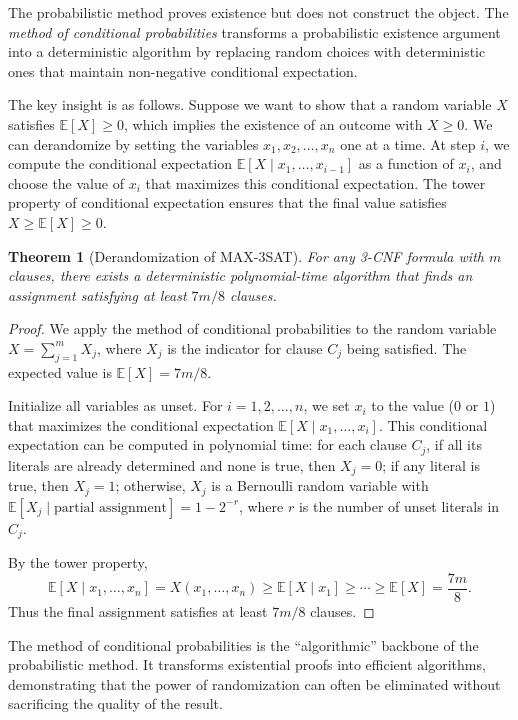 \documentclass[twoside,12pt]{book}
\theoremstyle{plain}
\newtheorem{theorem}{Theorem}[chapter]
\theoremstyle{definition}
\theoremstyle{remark}
\begin{document}
The probabilistic method proves existence but does not construct the
object. The \emph{method of conditional probabilities} transforms a
probabilistic existence argument into a deterministic algorithm by
replacing random choices with deterministic ones that maintain
non-negative conditional expectation.

The key insight is as follows. Suppose we want to show that a random
variable $X$ satisfies $\mathbb{E}[X] \geq 0$, which implies the existence
of an outcome with $X \geq 0$. We can derandomize by setting the variables
$x_1, x_2, \ldots, x_n$ one at a time. At step $i$, we compute the
conditional expectation $\mathbb{E}[X \mid x_1, \ldots, x_{i-1}]$ as a
function of $x_i$, and choose the value of $x_i$ that maximizes this
conditional expectation. The tower property of conditional expectation
ensures that the final value satisfies $X \geq \mathbb{E}[X] \geq 0$.

\begin{theorem}[Derandomization of MAX-3SAT]
\label{thm:derand-maxsat}
For any 3-CNF formula with $m$ clauses, there exists a deterministic
polynomial-time algorithm that finds an assignment satisfying at least
$7m/8$ clauses.
\end{theorem}

\begin{proof}
We apply the method of conditional probabilities to the random variable
$X = \sum_{j=1}^{m} X_j$, where $X_j$ is the indicator for clause $C_j$
being satisfied. The expected value is $\mathbb{E}[X] = 7m/8$.

Initialize all variables as unset. For $i = 1, 2, \ldots, n$, we set
$x_i$ to the value ($0$ or $1$) that maximizes the conditional expectation
$\mathbb{E}[X \mid x_1, \ldots, x_i]$. This conditional expectation can
be computed in polynomial time: for each clause $C_j$, if all its literals
are already determined and none is true, then $X_j = 0$; if any literal
is true, then $X_j = 1$; otherwise, $X_j$ is a Bernoulli random variable
with $\mathbb{E}[X_j \mid \text{partial assignment}] = 1 - 2^{-r}$, where
$r$ is the number of unset literals in $C_j$.

By the tower property,
\[
\mathbb{E}[X \mid x_1, \ldots, x_n] = X(x_1, \ldots, x_n) \geq
\mathbb{E}[X \mid x_1] \geq \cdots \geq \mathbb{E}[X] = \frac{7m}{8}.
\]
Thus the final assignment satisfies at least $7m/8$ clauses.
\end{proof}

The method of conditional probabilities is the ``algorithmic'' backbone of
the probabilistic method. It transforms existential proofs into efficient
algorithms, demonstrating that the power of randomization can often be
eliminated without sacrificing the quality of the result.
\end{document}
